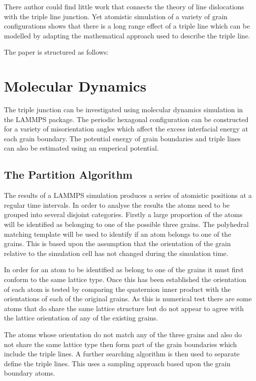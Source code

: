 \documentclass[12pt,a4paper]{book}
\begin{document}
There author could find little work that connects the theory of line dislocations with the triple line junction. Yet atomistic simulation of a variety of grain configurations shows that there is a long range effect of a triple line which can be modelled by adapting the mathematical approach used to describe the triple line.  

The paper is structured as follows:

 


\chapter{Molecular Dynamics}
The triple junction can be investigated using molecular dynamics simulation in the LAMMPS package. The periodic hexagonal configuration can be constructed for a variety of misorientation angles which affect the excess interfacial energy at each grain boundary. The potential energy of grain boundaries and triple lines can also be estimated using an emperical potential.
\section{The Partition Algorithm}
The results of a LAMMPS simulation produces a series of atomistic positions at a regular time intervals. In order to analyse the results the atoms need to be grouped into several disjoint categories. Firstly a large proportion of the atoms will be identified as belonging to one of the possible three grains. The polyhedral matching template will be used to identify if an atom belongs to one of the grains. This is based upon the assumption that the orientation of the grain relative to the simulation cell has not changed during the simulation time. 

In order for an atom to be identified as belong to one of the grains it must first conform to the same lattice type. Once this has been established the orientation of each atom is tested by comparing the quaternion inner product with the orientations of each of the original grains. As this is numerical test there are some atoms that do share the same lattice structure but do not appear to agree with the lattice orientation of any of the existing grains. 

The atoms whose orientation do not match any of the three grains and also do not share the same lattice type then form part of the grain boundaries which include the triple lines. A further searching algorithm is then used to separate define the triple lines. This uses a sampling approach based upon the grain boundary atoms. 
\end{document}
